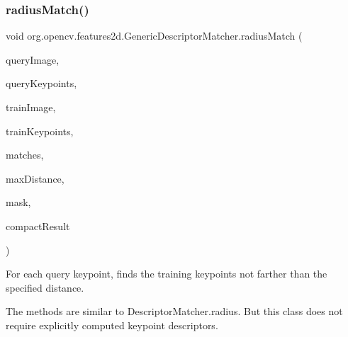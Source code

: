 \subsubsection{\texorpdfstring{radius\+Match()}{radiusMatch()}\hspace{0.1cm}{\footnotesize\ttfamily [1/4]}}
{\footnotesize\ttfamily void org.\+opencv.\+features2d.\+Generic\+Descriptor\+Matcher.\+radius\+Match (\begin{DoxyParamCaption}\item[{\mbox{\hyperlink{classorg_1_1opencv_1_1core_1_1_mat}{Mat}}}]{query\+Image,  }\item[{\mbox{\hyperlink{classorg_1_1opencv_1_1core_1_1_mat_of_key_point}{Mat\+Of\+Key\+Point}}}]{query\+Keypoints,  }\item[{\mbox{\hyperlink{classorg_1_1opencv_1_1core_1_1_mat}{Mat}}}]{train\+Image,  }\item[{\mbox{\hyperlink{classorg_1_1opencv_1_1core_1_1_mat_of_key_point}{Mat\+Of\+Key\+Point}}}]{train\+Keypoints,  }\item[{List$<$ \mbox{\hyperlink{classorg_1_1opencv_1_1core_1_1_mat_of_d_match}{Mat\+Of\+D\+Match}} $>$}]{matches,  }\item[{float}]{max\+Distance,  }\item[{\mbox{\hyperlink{classorg_1_1opencv_1_1core_1_1_mat}{Mat}}}]{mask,  }\item[{boolean}]{compact\+Result }\end{DoxyParamCaption})}

For each query keypoint, finds the training keypoints not farther than the specified distance.

The methods are similar to {\ttfamily Descriptor\+Matcher.\+radius}. But this class does not require explicitly computed keypoint descriptors.


